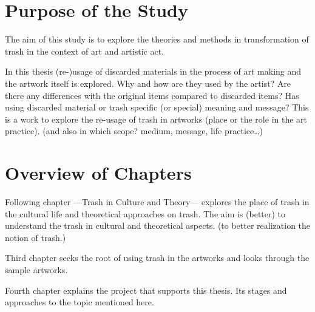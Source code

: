 \section{Purpose of the Study}

The aim of this study is to explore the theories and methods in transformation of trash in the context of art and artistic act.

In this thesis (re-)usage of discarded materials in the process of art making and the artwork itself is explored. Why and how are they used by the artist? Are there any differences with the original items compared to discarded items? Has using discarded material or trash specific (or special) meaning and message? This is a work to explore the re-usage of trash in artworks (place or the role in the art practice). (and also in which scope? medium, message, life practice\ldots) 





\section{Overview of Chapters}
Following chapter ---Trash in Culture and Theory--- explores the place of trash in the cultural life and theoretical approaches on trash. The aim is (better) to understand the trash in cultural and theoretical aspects. (to better realization the notion of trash.)

Third chapter seeks the root of using trash in the artworks and looks through the sample artworks.

Fourth chapter explains the project that supports this thesis. Its stages and approaches to the topic mentioned here.

